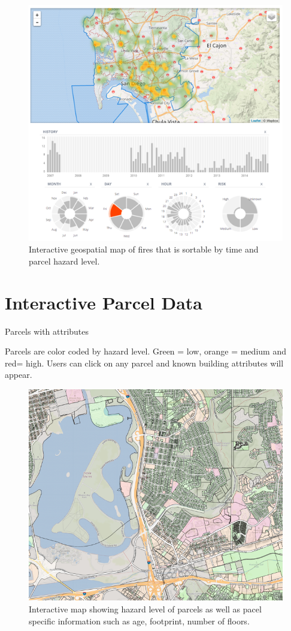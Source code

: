 \documentclass[12pt,oneside]{book}
\begin{document}
\begin{figure}[ht!]
\centering
\includegraphics[width=.9\columnwidth]{Figures/interactive_fire_map}
\caption{Interactive geospatial map of fires that is sortable by time and parcel hazard level.}
\label{fig:interactive_fire_map}
\end{figure}

\section{Interactive Parcel Data}

Parcels with attributes 

Parcels are color coded by hazard level.  Green = low, orange = medium and red= high.  Users can click on any parcel and known building attributes will appear. 


\begin{figure}[ht!]
\centering
\includegraphics[width=.9\columnwidth]{Figures/parcel_data}
\caption{Interactive map showing hazard level of parcels as well as pacel specific information such as age, footprint, number of floors.}
\label{fig:parcel_data}
\end{figure}
\end{document}
